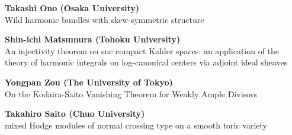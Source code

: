\documentclass[dvipdfmx,a4paper,12pt]{article}
\theoremstyle{plain} %
\theoremstyle{definition} %
\begin{document}
\vskip3mm
{\bf Takashi Ono (Osaka University)}\\
Wild harmonic bundles with skew-symmetric structure 

\vskip3mm
{\bf Shin-ichi Matsumura (Tohoku University)}\\
An injectivity theorem on snc compact Kahler spaces: an application of the theory of harmonic integrals on log-canonical centers via adjoint ideal sheaves

\vskip5mm
\vskip1mm
{\bf Yongpan Zou (The University of Tokyo)}\\
On the Kodaira-Saito Vanishing Theorem for Weakly Ample Divisors

\vskip3mm
{\bf Takahiro Saito (Chuo University)}\\
mixed Hodge modules of normal crossing type on a smooth toric 
variety





\begin{comment}

\begin{table}[htb]
\centering
  \begin{tabular}{| c | | c | c | c |}  \hline
  Time  & 3/22(水) & 3/23(木)& 3/23(金)  \\ \hline 
     \begin{tabular}{c} GMT 6:00-7:00 \\ (JST 15:00-16:00)\end{tabular}
&Shin-ichi Matsumura & Jihun Yum&Seungjae Lee \\ \hline
      \begin{tabular}{c}   GMT 7:10-8:10 \\ (JST 16:10-17:10)  \end{tabular}
& Junchao Shentu & Hoseob Seo&\sout{ Juanyong Wang}\\ \hline
 \begin{tabular}{c}   GMT 8:40-9:40\\ (JST 17:40-18:40) \end{tabular}
&  Feng Hao& F\'elix Lequen& Lukas Braun \\ \hline
 \begin{tabular}{c}   GMT 11:30-12:30\\ (JST 20:30-21:30) \end{tabular}
&  Xiaojun Wu &  Olivier Thom &    \\ \hline
  \end{tabular}
\end{table}
\end{comment}
\end{document}
